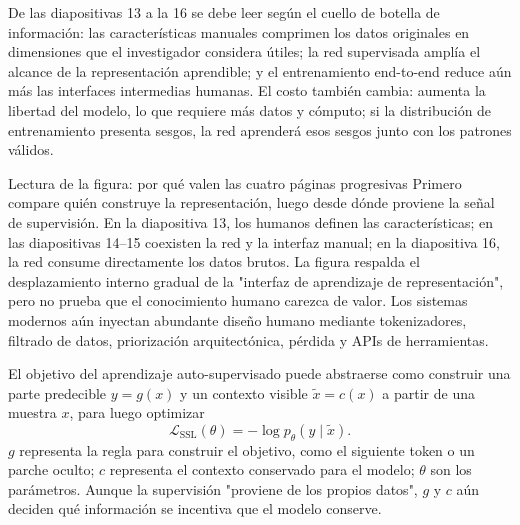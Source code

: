 

De las diapositivas 13 a la 16 se debe leer según el cuello de botella de información: las características manuales comprimen los datos originales en dimensiones que el investigador considera útiles; la red supervisada amplía el alcance de la representación aprendible; y el entrenamiento end-to-end reduce aún más las interfaces intermedias humanas. El costo también cambia: aumenta la libertad del modelo, lo que requiere más datos y cómputo; si la distribución de entrenamiento presenta sesgos, la red aprenderá esos sesgos junto con los patrones válidos.



\begin{knowledgebox}{Lectura de la figura: por qué valen las cuatro páginas progresivas}
Primero compare quién construye la representación, luego desde dónde proviene la señal de supervisión. En la diapositiva 13, los humanos definen las características; en las diapositivas 14--15 coexisten la red y la interfaz manual; en la diapositiva 16, la red consume directamente los datos brutos. La figura respalda el desplazamiento interno gradual de la "interfaz de aprendizaje de representación", pero no prueba que el conocimiento humano carezca de valor. Los sistemas modernos aún inyectan abundante diseño humano mediante tokenizadores, filtrado de datos, priorización arquitectónica, pérdida y APIs de herramientas.
\end{knowledgebox}

El objetivo del aprendizaje auto-supervisado puede abstraerse como construir una parte predecible $y=g(x)$ y un contexto visible $\tilde{x}=c(x)$ a partir de una muestra $x$, para luego optimizar
\[
\mathcal{L}_{\mathrm{SSL}}(\theta)
=-\log p_{\theta}\!\left(y\mid \tilde{x}\right).
\]
$g$ representa la regla para construir el objetivo, como el siguiente token o un parche oculto; $c$ representa el contexto conservado para el modelo; $\theta$ son los parámetros. Aunque la supervisión "proviene de los propios datos", $g$ y $c$ aún deciden qué información se incentiva que el modelo conserve.


